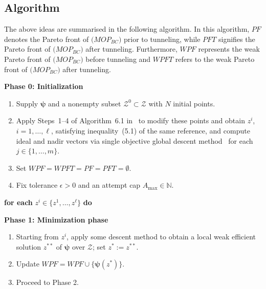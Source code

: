 \documentclass[amsa]{ipart}
\theoremstyle{plain}
\numberwithin{equation}{section}
\newcommand{\xlm}{z^*}                    %
\newcommand{\fvec}{\boldsymbol{\psi}}         %
\newcommand{\Feas}{\mathcal{Z}}               %
\begin{document}
\subsection{Algorithm}
\label{sec_alg}
The above ideas are summarised in the following algorithm. In this algorithm, $PF$ denotes the Pareto front of $\mathrm(MOP_{BC})$ prior to tunneling, while $PFT$ signifies the Pareto front of $\mathrm(MOP_{BC})$ after tunneling. Furthermore, $WPF$ represents the weak Pareto front of $\mathrm(MOP_{BC})$ before tunneling and $WPFT$ refers to the weak Pareto front of $\mathrm(MOP_{BC})$ after tunneling.\\
\begin{algorithm}[H]
\caption{\textit{Tunneling method for nonlinear multi-objective optimization problems}}
\label{alg1}
\vspace{0.5mm}
\begin{algorithmic}
\State \textbf{Phase 0: Initialization}
\begin{enumerate}[label=(\alph*)]
  \item Supply $\fvec$ and a nonempty subset $\Feas^0\subset\Feas$ with $N$ initial points.
  \item Apply Steps~1--4 of Algorithm~6.1 in~\cite{ansary2021sqcqp} to modify these points and obtain $z^i$, $i=1,\dots,\ell$, satisfying inequality~(5.1) of the same reference, and compute ideal and nadir vectors via single objective global descent method~\cite{duanli2010global} for each $j\in\{1,\dots,m\}$.
  \item Set  $WPF=WPFT =PF =PFT = \emptyset$.
  \item Fix tolerance $\epsilon>0$ and an attempt cap $A_{\max}\in\mathbb{N}$.
\end{enumerate}
\State \textbf{for each} $z^i \in \{z^1,\dots,z^\ell\}$ \textbf{do} \;

\State \textbf{Phase 1: Minimization phase}
\begin{enumerate}[label=(\alph*)]
    \item Starting from $z^i$, apply some descent method to obtain a local weak efficient solution $z^{**}$ of $\fvec$ over $\Feas$; set $\xlm := z^{**}$.
  \item Update $WPF=WPF \cup \{\fvec(\xlm)\}$.
  \item Proceed to Phase 2.
\end{enumerate}
\end{algorithmic}
\end{algorithm}
\end{document}
